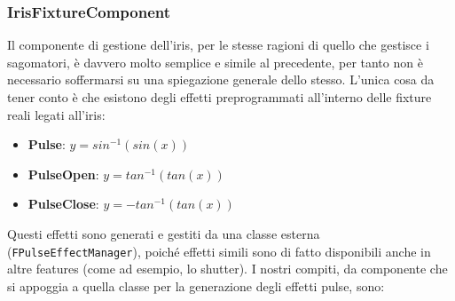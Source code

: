 \documentclass[main.tex]{subfiles}
\begin{document}
\subsubsection{IrisFixtureComponent}\label{subsec:5_1_IrisFixtureComponent}
Il componente di gestione dell'iris, per le stesse ragioni di quello che gestisce i sagomatori, è davvero molto semplice e simile al precedente, per tanto non è necessario soffermarsi su una spiegazione generale dello stesso. L'unica cosa da tener conto è che esistono degli effetti preprogrammati all'interno delle fixture reali legati all'iris:
\begin{itemize}
    \item \textbf{Pulse}: $y = sin^{-1}(sin(x))$
    \item \textbf{PulseOpen}: $y = tan^{-1}(tan(x))$
    \item \textbf{PulseClose}: $y = -tan^{-1}(tan(x))$
\end{itemize}
Questi effetti sono generati e gestiti da una classe esterna (\lstinline{FPulseEffectManager}), poiché effetti simili sono di fatto disponibili anche in altre features (come ad esempio, lo shutter). I nostri compiti, da componente che si appoggia a quella classe per la generazione degli effetti pulse, sono:
\end{document}
